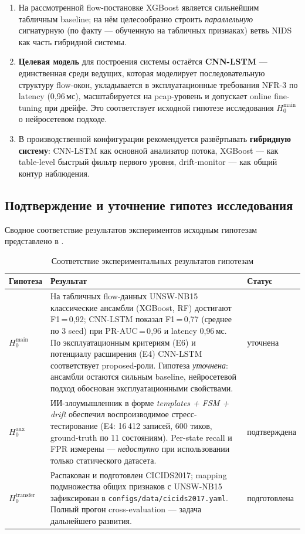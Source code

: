 \begin{enumerate}
    \item На рассмотренной flow-постановке XGBoost является сильнейшим
    табличным baseline; на нём целесообразно строить
    \emph{параллельную} сигнатурную (по факту --- обученную на
    табличных признаках) ветвь NIDS как часть гибридной системы.
    \item \textbf{Целевая модель} для построения системы остаётся
    \textbf{CNN-LSTM} --- единственная среди ведущих, которая
    моделирует последовательную структуру flow-окон,
    укладывается в эксплуатационные требования NFR-3 по latency
    (0{,}96\,мс), масштабируется на pcap-уровень и допускает online
    fine-tuning при дрейфе. Это соответствует исходной гипотезе
    исследования \(H_0^{\text{main}}\) о нейросетевом подходе.
    \item В производственной конфигурации рекомендуется развёртывать
    \textbf{гибридную систему}: CNN-LSTM как основной анализатор
    потока, XGBoost --- как table-level быстрый фильтр первого
    уровня, drift-monitor --- как общий контур наблюдения.
\end{enumerate}

\subsection{Подтверждение и уточнение гипотез исследования}

Сводное соответствие результатов экспериментов исходным
гипотезам представлено в .

\begin{table}[H]
\centering
\caption{Соответствие экспериментальных результатов гипотезам}
\label{tab:hypotheses-final}
\renewcommand{\arraystretch}{1.3}
\begin{tabularx}{\linewidth}{@{}lXl@{}}
\toprule
\textbf{Гипотеза} & \textbf{Результат} & \textbf{Статус} \\
\midrule
$H_0^{\text{main}}$ &
На табличных flow-данных UNSW-NB15 классические ансамбли (XGBoost,
RF) достигают F1\,=\,0{,}92; CNN-LSTM показал F1\,=\,0{,}77 (среднее
по 3 seed) при PR-AUC\,=\,0{,}96 и latency 0{,}96\,мс. По эксплуатационным
критериям (E6) и потенциалу расширения (E4) CNN-LSTM соответствует
proposed-роли. Гипотеза \emph{уточнена}: ансамбли остаются сильным
baseline, нейросетевой подход обоснован эксплуатационными свойствами. &
уточнена \\
\addlinespace
$H_0^{\text{aux}}$ &
ИИ-злоумышленник в форме \emph{templates + FSM + drift} обеспечил
воспроизводимое стресс-тестирование (E4: 16\,412 записей, 600 тиков,
ground-truth по 11 состояниям). Per-state recall и FPR измерены ---
\emph{недоступно} при использовании только статического датасета. &
подтверждена \\
\addlinespace
$H_0^{\text{transfer}}$ &
Распакован и подготовлен CICIDS2017; mapping подмножества общих
признаков с UNSW-NB15 зафиксирован в \verb|configs/data/cicids2017.yaml|.
Полный прогон cross-evaluation --- задача дальнейшего развития. &
подготовлена \\
\bottomrule
\end{tabularx}
\end{table}


